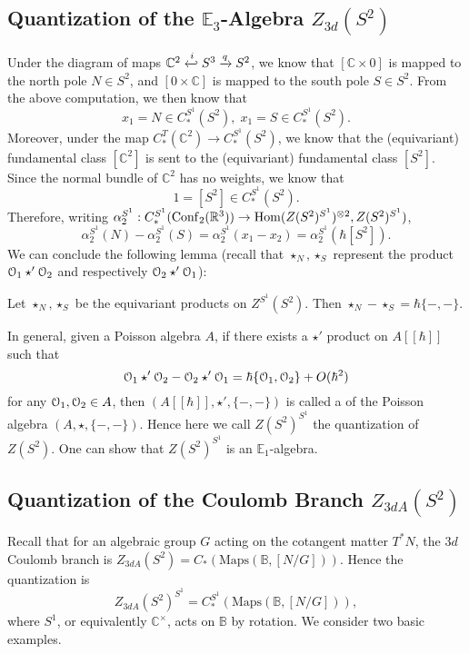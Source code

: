 \subsection{Quantization of the $\mathbb{E}_3$-Algebra $Z_{3d}(S^2)$}
Under the diagram of maps $\mathbb{C}^2 \xhookleftarrow{i} S^3 \xrightarrow{q} S^2$, we know that $[\mathbb{C} \times 0]$ is mapped to the north pole $N \in S^2$, and $[0 \times \mathbb{C}]$ is mapped to the south pole $S \in S^2$. From the above computation, we then know that 
$$x_1 = N \in C_*^{S^1}(S^2), \; x_1 = S \in C_*^{S^1}(S^2).$$
Moreover, under the map $C_*^{T}(\mathbb{C}^2) \rightarrow C_*^{S^1}(S^2)$, we know that the (equivariant) fundamental class $[\mathbb{C}^2]$ is sent to the (equivariant) fundamental class $[S^2]$. Since the normal bundle of $\mathbb{C}^2$ has no weights, we know that
$$1 = [S^2] \in C_*^{S^1}(S^2).$$
Therefore, writing $\alpha_2^{S^1}: C_*^{S^1}(\mathrm{Conf}_2(\mathbb{R}^3)) \rightarrow  \mathrm{Hom}(Z(S^2)^{S^1})^{\otimes 2}, Z(S^2)^{S^1})$,
$$\alpha_2^{S^1}(N) - \alpha_2^{S^1}(S) = \alpha_2^{S^1}(x_1 - x_2) = \alpha_2^{S^1}(\hbar [S^2]).$$
We can conclude the following lemma (recall that $\star_N, \star_S$ represent the product $\mathcal{O}_1 \star' \mathcal{O}_2$ and respectively $\mathcal{O}_2 \star' \mathcal{O}_1$):

\begin{Lemma}
    Let $\star_N, \star_S$ be the equivariant products on $Z^{S^1}(S^2)$. Then $\star_N - \star_S = \hbar\{-, -\}$.
\end{Lemma}

In general, given a Poisson algebra $A$, if there exists a $\star'$ product on $A[[\hbar]]$ such that 
$$\mathcal{O}_1 \star' \mathcal{O}_2 - \mathcal{O}_2 \star' \mathcal{O}_1 = \hbar\{\mathcal{O}_1, \mathcal{O}_2\} + O(\hbar^2)$$
for any $\mathcal{O}_1, \mathcal{O}_2 \in A$, then $(A[[\hbar]], \star', \{-, -\})$ is called a  of the Poisson algebra $(A, \star, \{-, -\})$. Hence here we call $Z(S^2)^{S^1}$ the quantization of $Z(S^2)$. One can show that $Z(S^2)^{S^1}$ is an $\mathbb{E}_1$-algebra.

\subsection{Quantization of the Coulomb Branch $Z_{3dA}(S^2)$}
Recall that for an algebraic group $G$ acting on the cotangent matter $T^*N$, the $3d$ Coulomb branch is $Z_{3dA}(S^2) = C_*(\mathrm{Maps}(\mathbb{B}, [N/G]))$. Hence the quantization is
$$Z_{3dA}(S^2)^{S^1} = C_*^{S^1}(\mathrm{Maps}(\mathbb{B}, [N/G])),$$
where $S^1$, or equivalently $\mathbb{C}^\times$, acts on $\mathbb{B}$ by rotation. We consider two basic examples.

